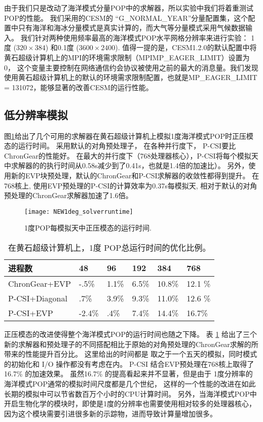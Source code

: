 由于我们只是改动了海洋模式分量POP中的求解器，所以实验中我们将着重测试POP的性能。 
我们采用的CESM的
``G\_NORMAL\_YEAR''分量配置集，这个配置中只有海洋和海冰分量模式是真实计算的，而大气等分量模式采用气候数据输入。
我们针对两种使用频率最高的海洋模式POP水平网格分辨率来进行实验：
1度 ($320\times 384$) 和0.1度 ($3600\times 2400$).
值得一提的是，CESM1.2.0的默认配置中将黄石超级计算机上的MPI的环境需求限制（MPIMP\_EAGER\_LIMIT）设置为0， 这个变量主要控制在网络通信约会协议被使用之前的最大的消息量。我们发现使用黄石超级计算机上的默认的环境需求限制配置，也就是MP\_EAGER\_LIMIT = 131072，能够显著的改善CESM的运行性能。 



\subsection{低分辨率模拟}
图\ref{fig:runtime1}给出了几个可用的求解器在黄石超级计算机上模拟1度海洋模式POP时正压模态的运行时间。  
采用默认的对角预处理子， 在各种并行度下， P-CSI要比ChronGear的性能好。
在最大的并行度下（768处理器核心），P-CSI将每个模拟天中求解器的的执行时间从0.58s减少到了0.41s，也就是1.4倍的加速比）。 
另外，使用新的EVP块预处理，默认的ChronGear和P-CSI求解器的收敛性都得到提升。 
在768核上, 使用EVP预处理的P-CSI的计算效率为0.37s每模拟天, 相对于默认的对角预处理的ChronGear求解器加速了1.6倍。 

\begin {figure}[!t]
\centering
\texttt{[image: NEW1deg\_solverruntime]}
\caption []{1度POP每模拟天中正压模态的运行时间.\label {fig:runtime1}}
\end {figure}

\begin{table}[!h]
\begin{center}
\caption{在黄石超级计算机上，1度 POP总运行时间的优化比例。 \label{tab:improve_1}}
\begin{tabular}{|l||l|l|l|l|l|}
\hline
进程数 & 48  & 96  & 192 & 384 & 768\\\hline
\hline
ChronGear+EVP & -.5\% & 1.1\%  & 6.5\% & 10.8\%  & 12.1 \% \\\hline
P-CSI+Diagonal  & .7\% &3.9\% &9.3\%  &11.0\% & 12.6 \% \\\hline
P-CSI+EVP	      &-2.4\% & .4\%	& 7.4\%  & 14.4\% & 16.7\%\\\hline
\end{tabular}
\end{center}
\end{table}


正压模态的改进使得整个海洋模式POP的运行时间也随之下降。
表 \ref{tab:improve_1} 给出了三个新的求解器和预处理子的不同搭配相比于原始的对角预处理的ChronGear求解的所带来的性能提升百分比。 
这里给出的时间都是 取之于一个五天的模拟，同时模式的初始化和 I/O 操作都没有考虑在内。 
P-CSI 结合EVP预处理在768核上取得了  16.7\% 的加速效果。
虽然16.7\% 的提高看起来并不显著，但是由于 1度分辨率的海洋模式POP通常的模拟时间尺度都是几个世纪， 这样的一个性能的改进在如此长期的模拟中可以节省数百万个小时的CPU计算时间。 
另外，当海洋模式POP中开启生物化学的模块时，即使是1度的分辨率也需要使用相对较多的处理器核心，因为这个模块需要引进很多新的示踪物，进而导致计算量增加很多。 

